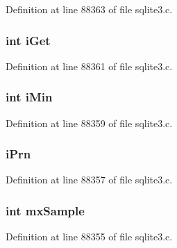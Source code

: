 Definition at line 88363 of file sqlite3.\+c.

\hypertarget{struct_stat4_accum_a75256a54ea63fee17419a860d7e1712f}{}
\subsubsection[{i\+Get}]{\setlength{\rightskip}{0pt plus 5cm}int i\+Get}\label{struct_stat4_accum_a75256a54ea63fee17419a860d7e1712f}


Definition at line 88361 of file sqlite3.\+c.

\hypertarget{struct_stat4_accum_abda8ced2962aa75eff51e5b07cfca50b}{}
\subsubsection[{i\+Min}]{\setlength{\rightskip}{0pt plus 5cm}int i\+Min}\label{struct_stat4_accum_abda8ced2962aa75eff51e5b07cfca50b}


Definition at line 88359 of file sqlite3.\+c.

\hypertarget{struct_stat4_accum_a19a0050772abcffd5bab5910dac2deee}{}
\subsubsection[{i\+Prn}]{ i\+Prn}\label{struct_stat4_accum_a19a0050772abcffd5bab5910dac2deee}


Definition at line 88357 of file sqlite3.\+c.

\hypertarget{struct_stat4_accum_a5a834cdb422be99fc2ac6bc8c0425ea2}{}
\subsubsection[{mx\+Sample}]{\setlength{\rightskip}{0pt plus 5cm}int mx\+Sample}\label{struct_stat4_accum_a5a834cdb422be99fc2ac6bc8c0425ea2}


Definition at line 88355 of file sqlite3.\+c.

\hypertarget{struct_stat4_accum_a354f4c2d87e40ee3eab3758d0716280e}{}
